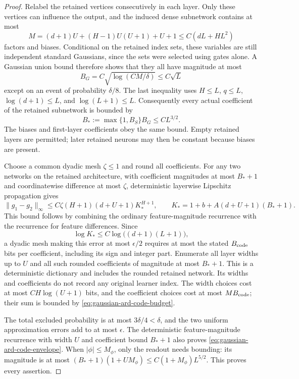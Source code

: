 \begin{proof}
Relabel the retained vertices consecutively in each layer. Only these vertices can influence the output, and the induced dense subnetwork contains at most
\[
 M=(d+1)U+(H-1)U(U+1)+U+1\le C(dL+HL^2)
\]
factors and biases. Conditional on the retained index sets, these variables are still independent standard Gaussians, since the sets were selected using gates alone. A Gaussian union bound therefore shows that they all have magnitude at most
\[
 B_G=C\sqrt{\log(CM/\delta)}\le C\sqrt L
\]
except on an event of probability $\delta/8$. The last inequality uses $H\le L$, $q\le L$, $\log(d+1)\le L$, and $\log(L+1)\le L$. Consequently every actual coefficient of the retained subnetwork is bounded by
\[
 B_*:=\max\{1,B_S\}B_G\le CL^{3/2}.
\]
The biases and first-layer coefficients obey the same bound. Empty retained layers are permitted; later retained neurons may then be constant because biases are present.

Choose a common dyadic mesh $\zeta\le1$ and round all coefficients. For any two networks on the retained architecture, with coefficient magnitudes at most $B_*+1$ and coordinatewise difference at most $\zeta$, deterministic layerwise Lipschitz propagation gives
\[
 \|g_1-g_2\|_\infty
 \le C\zeta(H+1)(d+U+1)K_*^{H+1},
 \qquad K_*=1+b+A(d+U+1)(B_*+1).
\]
This bound follows by combining the ordinary feature-magnitude recurrence with the recurrence for feature differences. Since
\[
 \log K_*\le C\log\big((d+1)(L+1)\big),
\]
a dyadic mesh making this error at most $\epsilon/2$ requires at most the stated $B_{\rm code}$ bits per coefficient, including its sign and integer part. Enumerate all layer widths up to $U$ and all such rounded coefficients of magnitude at most $B_*+1$. This is a deterministic dictionary and includes the rounded retained network. Its widths and coefficients do not record any original learner index. The width choices cost at most $CH\log(U+1)$ bits, and the coefficient choices cost at most $M B_{\rm code}$; their sum is bounded by \eqref{eq:gaussian-ard-code-budget}.

The total excluded probability is at most $3\delta/4<\delta$, and the two uniform approximation errors add to at most $\epsilon$. The deterministic feature-magnitude recurrence with width $U$ and coefficient bound $B_*+1$ also proves \eqref{eq:gaussian-ard-code-envelope}. When $|\phi|\le M_\phi$, only the readout needs bounding: its magnitude is at most $(B_*+1)(1+UM_\phi)\le C(1+M_\phi)L^{5/2}$. This proves every assertion.
\end{proof}
